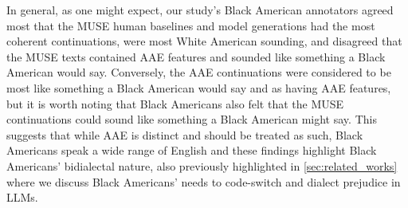 In general, as one might expect, our study’s Black American annotators agreed most that the MUSE human baselines and model generations had the most coherent continuations, were most White American sounding, and disagreed that the MUSE texts contained AAE features and sounded like something a Black American would say. Conversely, the AAE continuations were considered to be most like something a Black American would say and as having AAE features, but it is worth noting that Black Americans also felt that the MUSE continuations could sound like something a Black American might say. This suggests that while AAE is distinct and should be treated as such, Black Americans speak a wide range of English and these findings highlight Black Americans' bidialectal nature, also previously highlighted in \autoref{sec:related_works} where we discuss Black Americans' needs to code-switch and dialect prejudice in LLMs.
